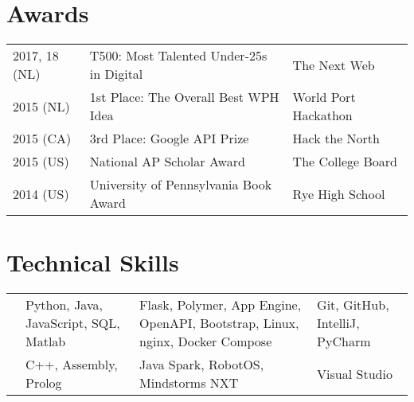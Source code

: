 \documentclass[]{deedy-resume-openfont}
\begin{document}
\begin{minipage}[t]{0.66\textwidth}
\section{Awards} 
\begin{tabular}{lll}
2017, 18 (NL)   & T500: Most Talented Under-25s in Digital  & The Next Web\\
2015 (NL)   & 1st Place: The Overall Best WPH Idea      & World Port Hackathon\\
2015 (CA)   & 3rd Place: Google API Prize               & Hack the North\\
2015 (US)   & National AP Scholar Award                 & The College Board\\
2014 (US)   & University of Pennsylvania Book Award     & Rye High School\\
\end{tabular}
\vspace{0.1\topsep}


\section{Technical Skills}
\vspace{-\topsep}
\begin{tabulary}{\linewidth}{LLLL}
    &  &  &  \\
    \hline
     & Python, Java, JavaScript, SQL, Matlab & Flask, Polymer, App Engine, OpenAPI, Bootstrap, Linux, nginx, Docker Compose  & Git, GitHub, IntelliJ, PyCharm \\
    \hline
     & C++, Assembly, Prolog & Java Spark, RobotOS, Mindstorms NXT & Visual Studio
\end{tabulary} 

\end{minipage} 
\end{document}
